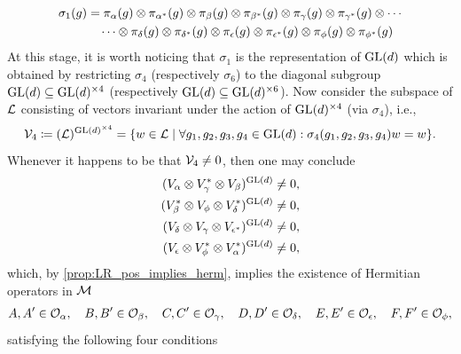 \documentclass[notitlepage, 10pt]{article}
\begin{document}
\begin{rem}
\begin{align}
        \begin{split}
            \label{eq:one_fold_action}
            \sigma_{1}(g)
            &= \pi_{\alpha}(g) \otimes \pi_{\alpha^*}(g) \otimes \pi_{\beta}(g) \otimes \pi_{\beta^*}(g) \otimes \pi_{\gamma}(g) \otimes \pi_{\gamma^*}(g) \otimes \cdots \\ &\quad\cdots\otimes\pi_{\delta}(g) \otimes \pi_{\delta^*}(g) \otimes \pi_{\epsilon}(g) \otimes \pi_{\epsilon^*}(g) \otimes \pi_{\phi}(g) \otimes \pi_{\phi^*}(g)
        \end{split}
    \end{align}
    At this stage, it is worth noticing that $\sigma_1$ is the representation of $\operatorname{GL}(d)$ which is obtained by restricting $\sigma_4$ (respectively $\sigma_6$) to the diagonal subgroup $\operatorname{GL}(d) \subseteq \operatorname{GL}(d)^{\times 4}$ (respectively $\operatorname{GL}(d) \subseteq \operatorname{GL}(d)^{\times 6}$).
    Now consider the subspace of $\mathcal L$ consisting of vectors invariant under the action of $\operatorname{GL}(d)^{\times 4}$ (via $\sigma_4$), i.e.,
    \begin{equation}
        \mathcal V_{4} \coloneqq (\mathcal L)^{\operatorname{GL}(d)^{\times 4}} = \{ w \in \mathcal L \mid \forall g_1, g_2, g_3, g_4 \in \operatorname{GL}(d) : \sigma_{4}(g_1, g_2, g_3, g_4) w = w \}.
    \end{equation}
    Whenever it happens to be that $\mathcal V_{4} \neq 0$, then one may conclude
    \begin{align}
        \begin{split}
            \label{eq:face_inv}
            (V_{\alpha} \otimes V_{\gamma}^{*} \otimes V_{\beta})^{\operatorname{GL}(d)} &\neq 0, \\
            (V_{\beta}^{*}  \otimes V_{\phi} \otimes V_{\delta}^{*})^{\operatorname{GL}(d)} &\neq 0, \\
            (V_{\delta} \otimes V_{\gamma} \otimes V_{\epsilon^{*}})^{\operatorname{GL}(d)} &\neq 0, \\
            (V_{\epsilon} \otimes V_{\phi}^{*}  \otimes V_{\alpha}^{*})^{\operatorname{GL}(d)} &\neq 0,
        \end{split}
    \end{align}
    which, by \cref{prop:LR_pos_implies_herm}, implies the existence of Hermitian operators in $\mathcal M$
    \begin{equation}
        \label{eq:prime_unprime}
        A, A' \in \mathcal O_{\alpha}, \quad
        B, B' \in \mathcal O_{\beta}, \quad
        C, C' \in \mathcal O_{\gamma}, \quad
        D, D' \in \mathcal O_{\delta}, \quad
        E, E' \in \mathcal O_{\epsilon}, \quad
        F, F' \in \mathcal O_{\phi},
    \end{equation}
    satisfying the following four conditions
    \begin{equation}

\end{equation}
\end{rem}
\end{document}
